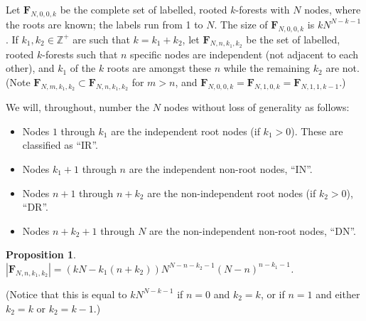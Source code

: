 \documentclass{article}
\newtheorem{proposition}{Proposition}[section]
\newcommand{\fzero}{\mathbf{F}_{N,0,0,k}}
\newcommand{\fm}{\mathbf{F}_{N,m,k_1,k_2}}
\newcommand{\fn}{\mathbf{F}_{N,n,k_1,k_2}}
\begin{document}
Let $\fzero$ be the complete set of labelled, rooted $k$-forests with $N$ nodes, where the roots are known; the labels run from 1 to $N$. The size of $\fzero$ is $kN^{N-k-1}$ \cite{Moon1970-li}. If $k_1,k_2\in\mathbb{Z}^+$ are such that $k=k_1+k_2$, let $\fn$ be the set of labelled, rooted $k$-forests such that $n$ specific nodes are independent (not adjacent to each other), and $k_1$ of the $k$ roots are amongst these $n$ while the remaining $k_2$ are not. (Note $\fm\subset\fn$ for $m>n$, and $\fzero=\mathbf{F}_{N,1,0,k}=\mathbf{F}_{N,1,1,k-1}$.) 

We will, throughout, number the $N$ nodes without loss of generality as follows:
\begin{itemize}
    \item Nodes $1$ through $k_1$ are the independent root nodes (if $k_1>0$). These are classified as ``IR''.
    \item Nodes $k_1+1$ through $n$ are the independent non-root nodes, ``IN''.
    \item Nodes $n+1$ through $n+k_2$ are the non-independent root nodes (if $k_2>0$), ``DR''.
    \item Nodes $n+k_2+1$ through $N$ are the non-independent non-root nodes, ``DN''.
\end{itemize}

\begin{proposition}\label{p1}
$|\fn|=(kN - k_1(n+k_2))N^{N-n-k_2-1}(N-n)^{n-k_1-1}$.
\end{proposition}
(Notice that this is equal to $kN^{N-k-1}$ if $n=0$ and $k_2=k$, or if  $n=1$ and either $k_2=k$ or $k_2=k-1$.) 
\end{document}
